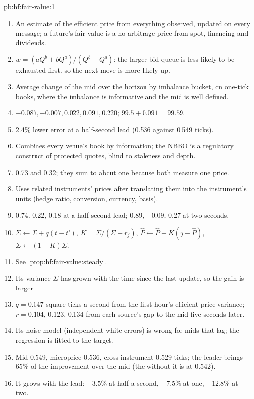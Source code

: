 \begin{solution}{pb:hf:fair-value:1}
\begin{enumerate}
\item An estimate of the efficient price from everything observed, updated on every message; a future's fair value is a no-arbitrage price from
spot, financing and dividends.
\item $w=(aQ^b+bQ^a)/(Q^b+Q^a)$: the larger bid queue is less likely to be exhausted first, so the next move is more likely up.
\item Average change of the mid over the horizon by imbalance bucket, on one-tick books, where the imbalance is informative and the mid is
well defined.
\item $-0.087,-0.007,0.022,0.091,0.220$; $99.5+0.091=99.59$.
\item 2.4\% lower error at a half-second lead (0.536 against 0.549 ticks).
\item Combines every venue's book by information; the NBBO is a regulatory construct of protected quotes, blind to staleness and depth.
\item 0.73 and 0.32; they sum to about one because both measure one price.
\item Uses related instruments' prices after translating them into the instrument's units (hedge ratio, conversion, currency, basis).
\item 0.74, 0.22, 0.18 at a half-second lead; 0.89, $-0.09$, 0.27 at two seconds.
\item $\Sigma\leftarrow\Sigma+q(t-t')$, $K=\Sigma/(\Sigma+r_j)$, $\hat P\leftarrow\hat P+K(y-\hat P)$, $\Sigma\leftarrow(1-K)\Sigma$.
\item See \cref{prop:hf:fair-value:steady}.
\item Its variance $\Sigma$ has grown with the time since the last update, so the gain is larger.
\item $q=0.047$ square ticks a second from the first hour's efficient-price variance; $r=0.104$, 0.123, 0.134 from each source's gap to the mid five
seconds later.
\item Its noise model (independent white errors) is wrong for mids that lag; the regression is fitted to the target.
\item Mid 0.549, microprice 0.536, cross-instrument 0.529 ticks; the leader brings 65\% of the improvement over the mid (the  without it is at 0.542).
\item It grows with the lead: $-3.5\%$ at half a second, $-7.5\%$ at one, $-12.8\%$ at two.

\end{enumerate}
\end{solution}
